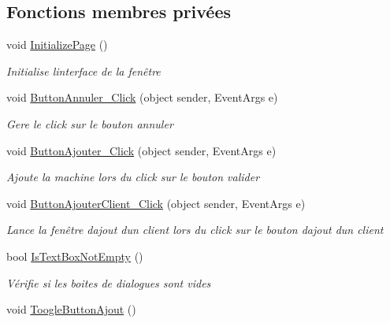 \subsection*{Fonctions membres privées}
\begin{DoxyCompactItemize}
\item 
void \mbox{\hyperlink{class_m_t_connect_agent_1_1_form_ajout_machine_a8782b1e6e835fbd2a925874bed63bc29}{Initialize\+Page}} ()
\begin{DoxyCompactList}\small\item\em Initialise l\textquotesingle{}interface de la fenêtre \end{DoxyCompactList}\item 
void \mbox{\hyperlink{class_m_t_connect_agent_1_1_form_ajout_machine_ae93513d1c019ddeeaaa1f04d8d723bf4}{Button\+Annuler\+\_\+\+Click}} (object sender, Event\+Args e)
\begin{DoxyCompactList}\small\item\em Gere le click sur le bouton annuler \end{DoxyCompactList}\item 
void \mbox{\hyperlink{class_m_t_connect_agent_1_1_form_ajout_machine_ac98f3d5f7eecc96683250f04466e8f69}{Button\+Ajouter\+\_\+\+Click}} (object sender, Event\+Args e)
\begin{DoxyCompactList}\small\item\em Ajoute la machine lors du click sur le bouton valider \end{DoxyCompactList}\item 
void \mbox{\hyperlink{class_m_t_connect_agent_1_1_form_ajout_machine_a2db9bc636b698deb1ae1aec251862360}{Button\+Ajouter\+Client\+\_\+\+Click}} (object sender, Event\+Args e)
\begin{DoxyCompactList}\small\item\em Lance la fenêtre d\textquotesingle{}ajout d\textquotesingle{}un client lors du click sur le bouton d\textquotesingle{}ajout d\textquotesingle{}un client \end{DoxyCompactList}\item 
bool \mbox{\hyperlink{class_m_t_connect_agent_1_1_form_ajout_machine_ab2aa6319f61b995ca37c62d29aa130ab}{Is\+Text\+Box\+Not\+Empty}} ()
\begin{DoxyCompactList}\small\item\em Vérifie si les boites de dialogues sont vides \end{DoxyCompactList}\item 
void \mbox{\hyperlink{class_m_t_connect_agent_1_1_form_ajout_machine_a36df449c486dc97b83b4d4463ef98e15}{Toogle\+Button\+Ajout}} ()

\end{DoxyCompactItemize}
